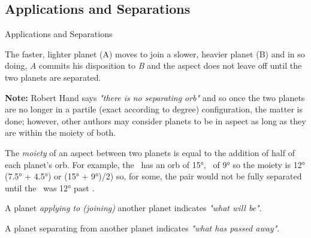 \subsection{Applications and Separations}

\begin{frame}[t]{Applications and Separations}
\begin{block}{}
The faster, lighter planet (A) moves to join a slower, heavier planet (B) and in so doing, \textsl{A} commits his disposition to \textsl{B} and the aspect does not leave off until the two planets are separated.
\end{block}

\begin{mdframed}[backgroundcolor=gray!5, rightmargin=2em, leftmargin=2em]
\textbf{Note:} Robert Hand says \textsl{"there is no separating orb"} and so once the two planets are no longer in a partile (exact according to degree) configuration, the matter is done; however, other authors may consider planets to be in aspect as long as they are within the moiety of both. 

The \textsl{moiety} of an aspect between two planets is equal to the addition of half of each planet's orb. For example, the \Sun\ has an orb of 15°, \Saturn\ of 9° so the moiety is 12° (7.5° + 4.5°) or (15° + 9°)/2) so, for some, the pair would not be fully separated until the \Sun\ was 12° past \Saturn.
\end{mdframed}

\begin{block}{}
A planet \textsl{applying to (joining)} another planet indicates \textsl{"what will be"}. 
\end{block}

\begin{block}{}
A planet separating from another planet indicates \textsl{"what has passed away"}.
\end{block}

\end{frame}
